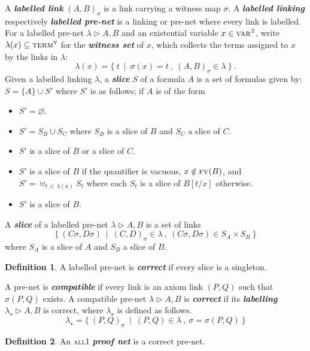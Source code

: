 \documentclass{article}
\theoremstyle{definition}
\newtheorem{definition}{Definition}
\theoremstyle{plain}
\newcommand\defn[1]{\textit{\textbf{#1}}}
\newcommand\varE{\textsc{var}^\exists}
\newcommand\termsA{\textsc{term}^\forall}
\newcommand\all{\textsc{all}}
\newcommand\+{+}
\renewcommand\*{\times}
\newcommand\fv{\textsc{fv}}
\newcommand\net[3]{#1\triangleright #2,#3}
\newcommand\clink[3][\sigma]{(#2,#3)_{#1}}
\begin{document}
A \defn{labelled link} $\clink AB$ is a link carrying a witness map $\sigma$. A \defn{labelled linking} respectively \defn{labelled pre-net} is a linking or pre-net where every link is labelled.
%
For a labelled pre-net $\net\lambda AB$ and an existential variable $x\in\varE$, write $\lambda(x)\subseteq\termsA$ for the \defn{witness set} of $x$, which collects the terms assigned to $x$ by the links in $\lambda$:
\[
	\lambda(x) = \{~t~\mid~\sigma(x) = t~,~\clink AB\in\lambda~\}~.
\]
%
Given a labelled linking $\lambda$, a \defn{slice} $S$ of a formula $A$ is a set of formulas given by: $S=\{A\}\cup S'$ where $S'$ is as follows; if $A$ is of the form
%
\begin{itemize}
	\item
{}				$S'=\varnothing$.
	\item
\makebox[40pt][l]{$B\+C$:} 			$S'=S_B\cup S_C$ where $S_B$ is a slice of $B$ and $S_C$ a slice of $C$.
	\item
\makebox[40pt][l]{$B\*C$:}			$S'$ is a slice of $B$ or a slice of $C$.
	\item
{}	$S'$ is a slice of $B$ if the quantifier is vacuous, $x\notin\fv(B)$, and
	\\[\itemsep]
	\hspace*{40pt}					$S'=\uplus_{t\,\in\,\lambda(x)}S_t$ where each $S_t$ is a slice of $B[t/x]$ otherwise.
	\item
{}	$S'$ is a slice of $B$.
\end{itemize}
%
A \defn{slice} of a labelled pre-net $\net\lambda AB$ is a set of links
\[
	\{~(C\sigma,D\sigma)~\mid~\clink CD\in \lambda~,~(C\sigma,D\sigma)\in S_A\times S_B~\}
\]
where $S_A$ is a slice of $A$ and $S_B$ a slice of $B$.

\begin{definition}
A labelled pre-net is \defn{correct} if every slice is a singleton.
\end{definition}

A pre-net is \defn{compatible} if every link is an axiom link $(P,Q)$ such that $\sigma(P,Q)$ exists. A compatible pre-net $\net\lambda AB$ is \defn{correct} if its \defn{labelling} $\net{\lambda_\star}AB$ is correct, where $\lambda_\star$ is defined as follows.
\[
	\lambda_\star=\{~\clink PQ~\mid~(P,Q)\in\lambda~,~\sigma=\sigma(P,Q)~\}
\]

\begin{definition}
An \all1 \defn{proof net} is a correct pre-net.
\end{definition}
\end{document}
